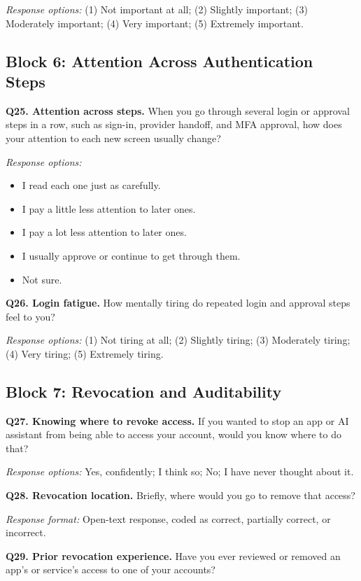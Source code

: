 \documentclass[11pt]{article}
\begin{document}
\textit{Response options:} (1) Not important at all; (2) Slightly important;
(3) Moderately important; (4) Very important; (5) Extremely important.

\subsection*{Block 6: Attention Across Authentication Steps}

\textbf{Q25. Attention across steps.}
When you go through several login or approval steps in a row, such as sign-in,
provider handoff, and MFA approval, how does your attention to each new screen
usually change?

\textit{Response options:}
\begin{itemize}[leftmargin=1.6em]
  \item I read each one just as carefully.
  \item I pay a little less attention to later ones.
  \item I pay a lot less attention to later ones.
  \item I usually approve or continue to get through them.
  \item Not sure.
\end{itemize}

\textbf{Q26. Login fatigue.}
How mentally tiring do repeated login and approval steps feel to you?

\textit{Response options:} (1) Not tiring at all; (2) Slightly tiring;
(3) Moderately tiring; (4) Very tiring; (5) Extremely tiring.

\subsection*{Block 7: Revocation and Auditability}

\textbf{Q27. Knowing where to revoke access.}
If you wanted to stop an app or AI assistant from being able to access your
account, would you know where to do that?

\textit{Response options:} Yes, confidently; I think so; No; I have never
thought about it.

\textbf{Q28. Revocation location.}
Briefly, where would you go to remove that access?

\textit{Response format:} Open-text response, coded as correct, partially
correct, or incorrect.

\textbf{Q29. Prior revocation experience.}
Have you ever reviewed or removed an app's or service's access to one of your
accounts?
\end{document}
